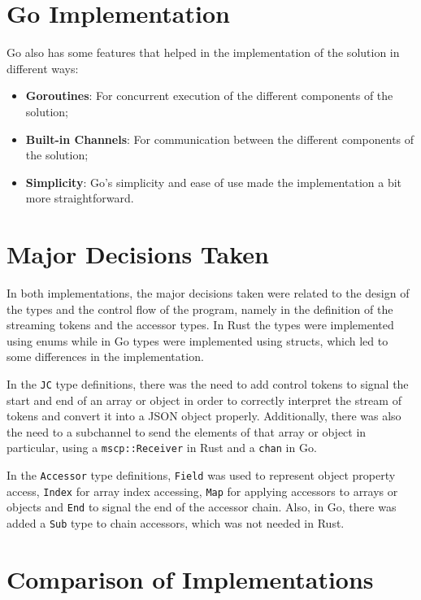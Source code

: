 \documentclass[a4paper]{article}
\begin{document}
\section{Go Implementation}

Go also has some features that helped in the implementation of the solution in different ways:

\begin{itemize}
    \item \textbf{Goroutines}: For concurrent execution of the different components of the solution;
    \item \textbf{Built-in Channels}: For communication between the different components of the solution;
    \item \textbf{Simplicity}: Go's simplicity and ease of use made the implementation a bit more straightforward.
\end{itemize}

\section{Major Decisions Taken}

In both implementations, the major decisions taken were related to the design of the types and the control flow of the program, namely in the definition of the streaming tokens and the accessor types. In Rust the types were implemented using enums while in Go types were implemented using structs, which led to some differences in the implementation.

In the \texttt{JC} type definitions, there was the need to add control tokens to signal the start and end of an array or object in order to correctly interpret the stream of tokens and convert it into a JSON object properly. Additionally, there was also the need to a subchannel to send the elements of that array or object in particular, using a \texttt{mscp::Receiver} in Rust and a \texttt{chan} in Go.

In the \texttt{Accessor} type definitions, \texttt{Field} was used to represent object property access, \texttt{Index} for array index accessing, \texttt{Map} for applying accessors to arrays or objects and \texttt{End} to signal the end of the accessor chain. Also, in Go, there was added a \texttt{Sub} type to chain accessors, which was not needed in Rust.

\section{Comparison of Implementations}
\end{document}
